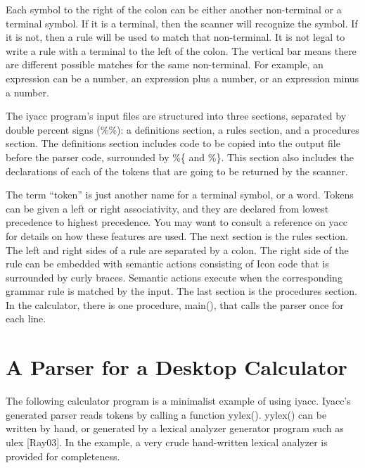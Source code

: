 \documentclass[letterpaper,12pt]{article}
\begin{document}
Each symbol to the right of the colon can be either 
another non-terminal or a terminal symbol. If it is a terminal, then the 
scanner will recognize the symbol. If it is not, then a rule will be used to 
match that non-terminal. It is not legal to write a rule with a
terminal to the left of the colon. The vertical bar means there
are different possible matches for the same non-terminal.  For
example, an expression can be a number, an expression plus a
number, or an expression minus a number. 

The iyacc program’s input files are structured into three sections,
separated by double percent signs (\%\%):
a definitions section, a rules section, and a procedures section. 
The definitions section includes code to be copied into the output file before 
the parser code, surrounded by \%\{ and \%\}. This section also includes the 
declarations of each of the tokens that are going to be returned by the 
scanner.

The term ``token'' is just another name for a terminal symbol, or a 
word. Tokens can be given a left or right associativity, and they are declared 
from lowest precedence to highest precedence. You may want to consult a 
reference on yacc for details on how these features are used. The next 
section is the rules section. The left and right sides of a rule are separated
by a colon. The right side of the rule can be embedded with semantic actions 
consisting of Icon code that is surrounded by curly braces. Semantic actions 
execute when the corresponding grammar rule is matched by the input. The 
last  section  is  the  procedures  section.  In  the  calculator,
there is one procedure, main(), that calls the parser once for each line.


\section{A Parser for a Desktop Calculator}

The following calculator program is a minimalist example of using iyacc.
Iyacc's generated parser reads tokens by calling a function yylex().
yylex() can be written by hand, or generated by a lexical analyzer
generator program such as ulex [Ray03]. In the example, a very crude
hand-written lexical analyzer is provided for completeness.
\end{document}
